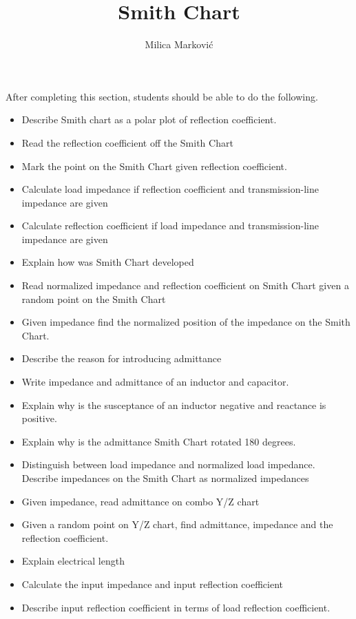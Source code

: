 \documentclass{ximera}
\title{Smith Chart}
\author{Milica Markovi{\'c}}
\begin{document}
\begin{abstract}
\end{abstract}

\maketitle

\begin{sectionOutcomes}

After completing this section, students should be able to do the following.

\begin{itemize}
\item Describe Smith chart as a polar plot of reflection coefficient.
\item Read the reflection coefficient off the Smith Chart
\item Mark the point on the Smith Chart given reflection coefficient.
\item Calculate load impedance if reflection coefficient and transmission-line impedance are given
\item Calculate reflection coefficient if load impedance and transmission-line impedance are given
\item Explain how was Smith Chart developed
\item Read normalized impedance and reflection coefficient on Smith Chart  given a random point on the Smith Chart
\item Given impedance find the normalized position of the impedance on the Smith Chart.
\item Describe the reason for introducing admittance
\item Write impedance and admittance of an inductor and capacitor. 
\item Explain why is the susceptance of an inductor negative and reactance is positive. 
\item Explain why is the admittance Smith Chart rotated 180 degrees.
\item Distinguish between load impedance and normalized load impedance. Describe impedances on the Smith Chart as normalized impedances
\item Given impedance, read admittance on combo Y/Z chart
\item Given a random point on Y/Z chart, find admittance, impedance and the reflection coefficient.
\item Explain electrical length
\item Calculate the input impedance and input reflection coefficient
\item Describe input reflection coefficient in terms of load reflection coefficient.
\end{itemize}

\end{sectionOutcomes}
\end{document}

